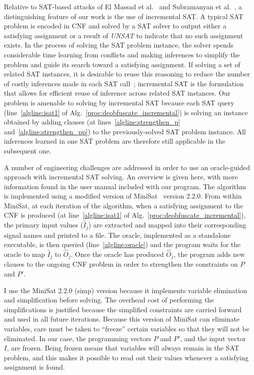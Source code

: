 \documentclass[proposal]{umassthesis}  %
\begin{document}
Relative to SAT-based attacks of El Massad et al.~\cite{elmassad-15} and Subramanyan et al.~\cite{subramanyan-15}, a distinguishing feature of our work is the use of incremental SAT. A typical SAT problem is encoded in CNF and solved by a SAT solver to output either a satisfying assignment or a result of \textit{UNSAT} to indicate that no such assignment exists. In the process of solving the SAT problem instance, the solver spends considerable time learning from conflicts and making inferences to simplify the problem and guide its search toward a satisfying assignment. If solving a set of related SAT instances, it is desirable to reuse this reasoning to reduce the number of costly inferences made in each SAT call~\cite{een2003temporal}; incremental SAT is the formulation that allows for efficient reuse of inference across related SAT instances. Our problem is amenable to solving by incremental SAT because each SAT query (line~\ref{algline:isat1} of Alg.~\ref{proc:deobfuscate_incremental}) is solving an instance obtained by adding clauses (at lines~\ref{algline:strengthen_p} and~\ref{algline:strengthen_pp}) to the previously-solved SAT problem instance. All inferences learned in one SAT problem are therefore still applicable in the subsequent one. 

A number of engineering challenges are addressed in order to use an oracle-guided approach with incremental SAT solving. An overview is given here, with more information found in the user manual included with our program. The algorithm is implemented using a modified version of MiniSat~\cite{een-04} version 2.2.0. From within MiniSat, at each iteration of the algorithm, when a satisfying assignment to the CNF is produced (at line~\ref{algline:isat1} of Alg.~\ref{proc:deobfuscate_incremental}), the primary input values ($\widehat{I}_j$) are extracted and mapped into their corresponding signal names and printed to a file. The oracle, implemented as a standalone executable, is then queried (line~\ref{algline:oracle}) and the program waits for the oracle to map $\widehat{I}_j$ to $\widehat{O}_j$. Once the oracle has produced $\widehat{O}_j$, the program adds new clauses to the ongoing CNF problem in order to strengthen the constraints on $P$ and $P'$.

I use the MiniSat 2.2.0 (simp) version because it implements variable elimination and simplification before solving. The overhead cost of performing the simplifications is justified because the simplified constraints are carried forward and used in all future iterations. Because this version of MiniSat can eliminate variables, care must be taken to ``freeze'' certain variables so that they will not be eliminated. In our case, the programming vectors $P$ and $P'$, and the input vector $I$, are frozen. Being frozen means that variables will always remain in the SAT problem, and this makes it possible to read out their values whenever a satisfying assignment is found.
\end{document}
